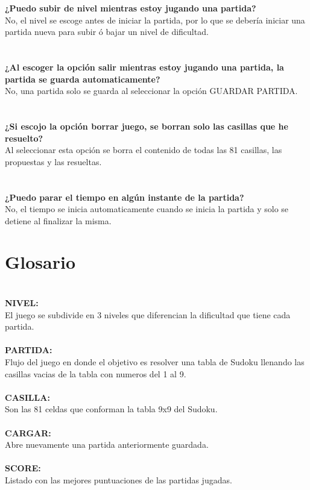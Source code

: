 \documentclass[12pt,oneside]{book}
\begin{document}
\begin{center}

\textbf{¿Puedo subir de nivel mientras estoy jugando una partida?} \\ No, el nivel se escoge antes de iniciar la partida, por lo que se debería iniciar una partida nueva para subir ó bajar un nivel de dificultad.
\ \\ \ \\ \ \\

\textbf{¿Al escoger la opción salir mientras estoy jugando una partida, la partida se guarda automaticamente?} \\ No, una partida solo se guarda al seleccionar la opción GUARDAR PARTIDA.
\ \\ \ \\ \ \\

\textbf{¿Si escojo la opción borrar juego, se borran solo las casillas que he resuelto?} \\ Al seleccionar esta opción se borra el contenido de todas las 81 casillas, las propuestas y las resueltas.
\ \\ \ \\ \ \\

\textbf{¿Puedo parar el tiempo en algún instante de la partida?} \\ No, el tiempo se inicia automaticamente cuando se inicia la partida y solo se detiene al finalizar la misma.


\end{center}

\chapter{Glosario}
\ \\
\textbf{NIVEL:} \\ El juego se subdivide en 3 niveles que diferencian la dificultad que tiene cada partida.
\ \\ \ \\ 
\textbf{PARTIDA:} \\ Flujo del juego en donde el objetivo es resolver una tabla de Sudoku llenando las casillas vacias de la tabla con numeros del 1 al 9.
\ \\ \ \\ 
\textbf{CASILLA:} \\Son las 81 celdas que conforman la tabla 9x9 del Sudoku.
\ \\ \ \\ 
\textbf{CARGAR:} \\ Abre nuevamente una partida anteriormente guardada.
\ \\ \ \\
\textbf{SCORE:} \\ Listado con las mejores puntuaciones de las partidas jugadas.
\end{document}
